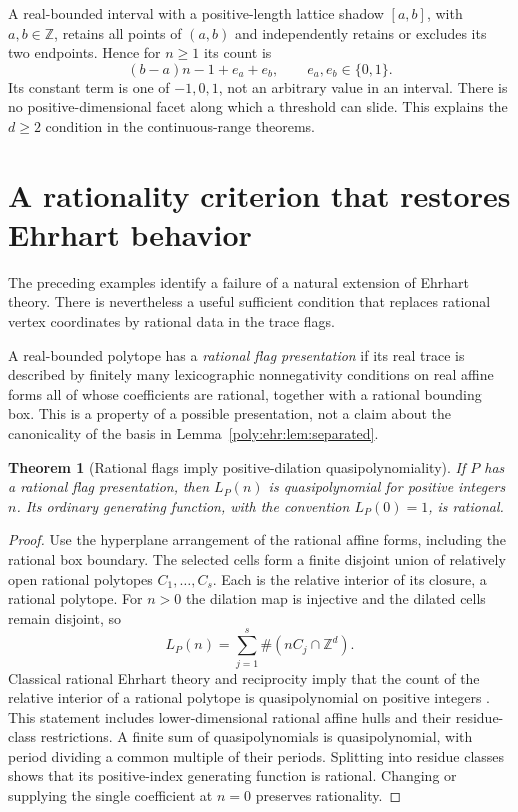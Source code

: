 \documentclass[11pt,a4paper]{article}
\numberwithin{equation}{section}
\newtheorem{theorem}{Theorem}[section]
\theoremstyle{plain}
\newcommand{\Z}{\mathbb Z}
\begin{document}
A real-bounded interval with a positive-length lattice shadow $[a,b]$, with
$a,b\in\Z$, retains all points of $(a,b)$ and independently retains or
excludes its two endpoints. Hence for $n\geq1$ its count is
\[
 (b-a)n-1+e_a+e_b,\qquad e_a,e_b\in\{0,1\}.
\]
Its constant term is one of $-1,0,1$, not an arbitrary value in an interval.
There is no positive-dimensional facet along which a threshold can slide.
This explains the $d\geq2$ condition in the continuous-range theorems.

\section{A rationality criterion that restores Ehrhart behavior}
\label{poly:ehr:sec:rational}

The preceding examples identify a failure of a natural extension of Ehrhart
theory. There is nevertheless a useful sufficient condition that replaces
rational vertex coordinates by rational data in the trace flags.

\begin{definition}\label{poly:ehr:def:rational-flags}
A real-bounded polytope has a \emph{rational flag presentation} if its real
trace is described by finitely many lexicographic nonnegativity conditions
on real affine forms all of whose coefficients are rational, together with
a rational bounding box. This is a property of a possible presentation,
not a claim about the canonicality of the basis in
Lemma~\ref{poly:ehr:lem:separated}.
\end{definition}

\begin{theorem}[Rational flags imply positive-dilation quasipolynomiality]
\label{poly:ehr:thm:rational-flags}
If $P$ has a rational flag presentation, then $L_P(n)$ is quasipolynomial
for positive integers $n$. Its ordinary generating function, with the
convention $L_P(0)=1$, is rational.
\end{theorem}
\begin{proof}
Use the hyperplane arrangement of the rational affine forms, including
the rational box boundary. The selected cells form a finite disjoint
union of relatively open rational polytopes $C_1,\ldots,C_s$. Each is the
relative interior of its closure, a rational polytope. For $n>0$ the
dilation map is injective and the dilated cells remain disjoint, so
\[
 L_P(n)=\sum_{j=1}^s\#(nC_j\cap\Z^d).
\]
Classical rational Ehrhart theory and reciprocity imply that the count of
the relative interior of a rational polytope is quasipolynomial on positive
integers \cite{ehr:sam-woods}. This statement includes lower-dimensional
rational affine hulls and their residue-class restrictions. A finite sum
of quasipolynomials is quasipolynomial, with period dividing a common
multiple of their periods. Splitting into residue classes shows that its
positive-index generating function is rational. Changing or supplying the
single coefficient at $n=0$ preserves rationality.
\end{proof}
\end{document}
